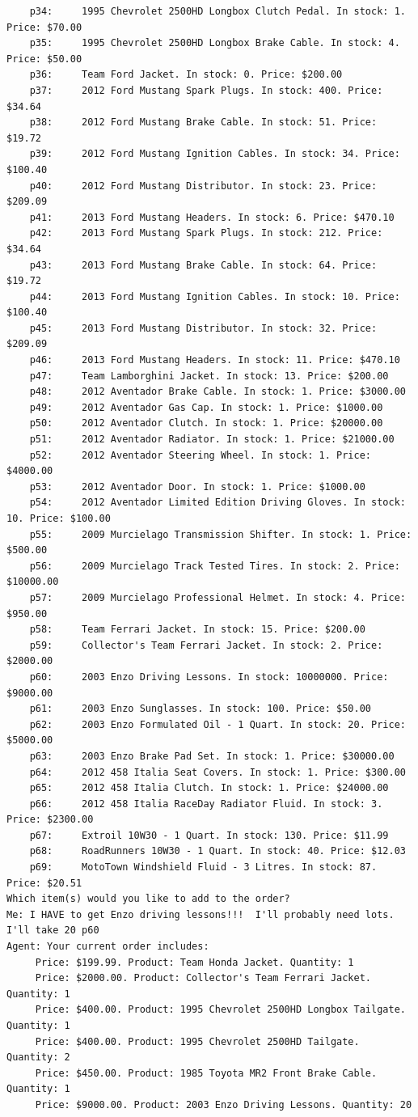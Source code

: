 \documentclass[11pt, titlepage]{article}
\begin{document}
\begin{lstlisting}
	p34:	 1995 Chevrolet 2500HD Longbox Clutch Pedal. In stock: 1. Price: $70.00
	p35:	 1995 Chevrolet 2500HD Longbox Brake Cable. In stock: 4. Price: $50.00
	p36:	 Team Ford Jacket. In stock: 0. Price: $200.00
	p37:	 2012 Ford Mustang Spark Plugs. In stock: 400. Price: $34.64
	p38:	 2012 Ford Mustang Brake Cable. In stock: 51. Price: $19.72
	p39:	 2012 Ford Mustang Ignition Cables. In stock: 34. Price: $100.40
	p40:	 2012 Ford Mustang Distributor. In stock: 23. Price: $209.09
	p41:	 2013 Ford Mustang Headers. In stock: 6. Price: $470.10
	p42:	 2013 Ford Mustang Spark Plugs. In stock: 212. Price: $34.64
	p43:	 2013 Ford Mustang Brake Cable. In stock: 64. Price: $19.72
	p44:	 2013 Ford Mustang Ignition Cables. In stock: 10. Price: $100.40
	p45:	 2013 Ford Mustang Distributor. In stock: 32. Price: $209.09
	p46:	 2013 Ford Mustang Headers. In stock: 11. Price: $470.10
	p47:	 Team Lamborghini Jacket. In stock: 13. Price: $200.00
	p48:	 2012 Aventador Brake Cable. In stock: 1. Price: $3000.00
	p49:	 2012 Aventador Gas Cap. In stock: 1. Price: $1000.00
	p50:	 2012 Aventador Clutch. In stock: 1. Price: $20000.00
	p51:	 2012 Aventador Radiator. In stock: 1. Price: $21000.00
	p52:	 2012 Aventador Steering Wheel. In stock: 1. Price: $4000.00
	p53:	 2012 Aventador Door. In stock: 1. Price: $1000.00
	p54:	 2012 Aventador Limited Edition Driving Gloves. In stock: 10. Price: $100.00
	p55:	 2009 Murcielago Transmission Shifter. In stock: 1. Price: $500.00
	p56:	 2009 Murcielago Track Tested Tires. In stock: 2. Price: $10000.00
	p57:	 2009 Murcielago Professional Helmet. In stock: 4. Price: $950.00
	p58:	 Team Ferrari Jacket. In stock: 15. Price: $200.00
	p59:	 Collector's Team Ferrari Jacket. In stock: 2. Price: $2000.00
	p60:	 2003 Enzo Driving Lessons. In stock: 10000000. Price: $9000.00
	p61:	 2003 Enzo Sunglasses. In stock: 100. Price: $50.00
	p62:	 2003 Enzo Formulated Oil - 1 Quart. In stock: 20. Price: $5000.00
	p63:	 2003 Enzo Brake Pad Set. In stock: 1. Price: $30000.00
	p64:	 2012 458 Italia Seat Covers. In stock: 1. Price: $300.00
	p65:	 2012 458 Italia Clutch. In stock: 1. Price: $24000.00
	p66:	 2012 458 Italia RaceDay Radiator Fluid. In stock: 3. Price: $2300.00
	p67:	 Extroil 10W30 - 1 Quart. In stock: 130. Price: $11.99
	p68:	 RoadRunners 10W30 - 1 Quart. In stock: 40. Price: $12.03
	p69:	 MotoTown Windshield Fluid - 3 Litres. In stock: 87. Price: $20.51
Which item(s) would you like to add to the order?
Me: I HAVE to get Enzo driving lessons!!!  I'll probably need lots.  I'll take 20 p60
Agent: Your current order includes:
	 Price: $199.99. Product: Team Honda Jacket. Quantity: 1
	 Price: $2000.00. Product: Collector's Team Ferrari Jacket. Quantity: 1
	 Price: $400.00. Product: 1995 Chevrolet 2500HD Longbox Tailgate. Quantity: 1
	 Price: $400.00. Product: 1995 Chevrolet 2500HD Tailgate. Quantity: 2
	 Price: $450.00. Product: 1985 Toyota MR2 Front Brake Cable. Quantity: 1
	 Price: $9000.00. Product: 2003 Enzo Driving Lessons. Quantity: 20


\end{lstlisting}
\end{document}
